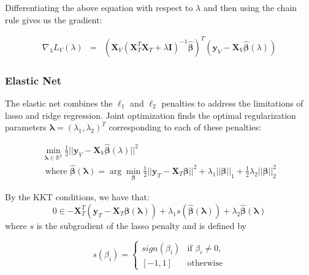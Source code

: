 \documentclass[10pt,letterpaper]{article}
\begin{document}
Differentiating the above equation with respect to $\lambda$ and then using the chain rule gives us the gradient:

\begin{equation}
\begin{array} {lcl}
\nabla_\lambda L_V(\lambda)
&=& (\boldsymbol{X}_V(\boldsymbol{X}_T^T \boldsymbol{X}_T + \lambda \boldsymbol{I})^{-1}
\hat{\boldsymbol{\beta}})^T(\boldsymbol{y}_V - \boldsymbol{X}_V \hat{\boldsymbol{\beta}}(\lambda))
\end{array}
\end{equation}

\subsubsection{Elastic Net}

The elastic net combines the $\ell_1$ and $\ell_2$ penalties to address the limitations of lasso and ridge regression. Joint optimization finds the optimal regularization parameters $\boldsymbol{\lambda} = (\lambda_1, \lambda_2)^T$ corresponding to each of these penalties:

\begin{equation}
\begin{array}{c}
\min_{\boldsymbol{\lambda} \in \mathbb{R}^2} \frac{1}{2} \lvert\lvert \boldsymbol{y}_V - \boldsymbol{X}_V \hat{\boldsymbol{\beta}} (\lambda) \rvert\rvert ^2 \\
\text{ where }
\hat{\boldsymbol{\beta}} (\boldsymbol{\lambda}) = \arg \min_{\boldsymbol{\beta}} \frac{1}{2} \lvert\lvert \boldsymbol{y}_T - \boldsymbol{X}_T \boldsymbol{\beta} \rvert\rvert ^2
+ \lambda_1 \lvert\lvert \boldsymbol{\beta} \rvert \rvert_1
+ \frac{1}{2}\lambda_2 \lvert\lvert \boldsymbol{\beta} \rvert \rvert_2^2
\end{array}
\end{equation}

By the KKT conditions, we have that:
\begin{equation}
0 \in -\boldsymbol{X}_T^T(\boldsymbol{y}_T
- \boldsymbol{X}_T \hat{\boldsymbol{\beta}} (\boldsymbol{\lambda}) )
+ \lambda_1 s(\hat{\boldsymbol{\beta}} (\boldsymbol{\lambda}))
+ \lambda_2 \hat{\boldsymbol{\beta}} (\boldsymbol{\lambda})
\end{equation}
where $s$ is the subgradient of the lasso penalty and is defined by

\begin{equation}
s(\beta_i) = \begin{cases}
  sign(\beta_i) & \text{if } \beta_i \ne 0, \\
  [-1, 1] & \text{otherwise}
\end{cases}
\end{equation}
\end{document}
